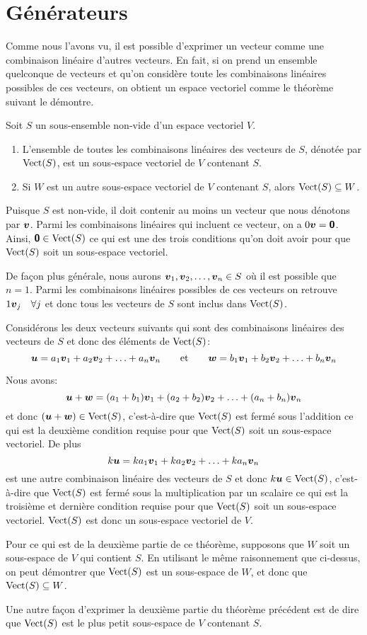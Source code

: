 \section{Générateurs}
Comme nous l'avons vu, il est possible d'exprimer un vecteur comme une combinaison linéaire d'autres vecteurs.
En fait, si on prend un ensemble quelconque de vecteurs et qu'on considère toute les combinaisons linéaires possibles
de ces vecteurs, on obtient un espace vectoriel comme le théorème suivant le démontre.
\begin{theo}
Soit $S$ un sous-ensemble non-vide d'un espace vectoriel $V$.  
\begin{enumerate}
\item L'ensemble de toutes les combinaisons linéaires
des vecteurs de $S$, dénotée par $\operatorname{Vect}(S)$, est un sous-espace vectoriel de $V$ contenant $S$.  
\item Si
$W$ est un autre sous-espace vectoriel de $V$ contenant $S$, alors $\operatorname{Vect}(S)\subseteq W$.
\end{enumerate}
\proof
Puisque $S$ est non-vide, il doit contenir au moins un vecteur que nous dénotons par $\boldsymbol{v}$.  
Parmi les combinaisons linéaires qui incluent ce vecteur, on a $0\boldsymbol{v} = \mbox{\textsf{\textbf{{0}}}}$. 
 Ainsi, $\mbox{\textsf{\textbf{{0}}}}\in \operatorname{Vect}(S)$ ce qui est une des
trois conditions qu'on doit avoir pour que $\operatorname{Vect}(S)$ soit un sous-espace vectoriel.

De façon plus générale, nous aurons $\boldsymbol{v}_1,\boldsymbol{v}_2, \ldots, \boldsymbol{v}_n \in S$ où il est possible que $n=1$. Parmi les combinaisons linéaires possibles de ces vecteurs on retrouve $1 \boldsymbol{v}_j \quad \forall j$ et donc 
tous les vecteurs de $S$ sont inclus dans $\operatorname{Vect}(S)$.

Considérons les deux vecteurs suivants qui sont des combinaisons linéaires des vecteurs de $S$ et donc
des éléments de $\operatorname{Vect}(S)$:
\[ 
    \boldsymbol{u} = a_1\boldsymbol{v}_1 + a_2 \boldsymbol{v}_2 + \ldots + a_n \boldsymbol{v}_n \qquad \mbox{et} \qquad 
    \boldsymbol{w} = b_1\boldsymbol{v}_1 + b_2 \boldsymbol{v}_2 + \ldots + b_n \boldsymbol{v}_n
\]

Nous avons:
\[
    \boldsymbol{u} + \boldsymbol{w} = (a_1 + b_1)\boldsymbol{v}_1 + (a_2 + b_2) \boldsymbol{v}_2 + \ldots + (a_n+ b_n) \boldsymbol{v}_n 
\]
et donc $(\boldsymbol{u} + \boldsymbol{w} ) \in \operatorname{Vect}(S)$, c'est-à-dire que $\operatorname{Vect}(S)$ est fermé sous l'addition ce qui
est la deuxième condition requise pour que $\operatorname{Vect}(S)$ soit un sous-espace vectoriel.
De plus
\[
 k \boldsymbol{u} = ka_1\boldsymbol{v}_1 + ka_2 \boldsymbol{v}_2 + \ldots + ka_n \boldsymbol{v}_n
 \]
est une autre combinaison linéaire des vecteurs de $S$ 
et donc $k\boldsymbol{u} \in \operatorname{Vect}(S)$, c'est-à-dire que  $\operatorname{Vect}(S)$ est fermé sous la multiplication par un scalaire ce qui
est la troisième et dernière condition requise pour que $\operatorname{Vect}(S)$ soit un sous-espace vectoriel.  $\operatorname{Vect}(S)$ est donc un sous-espace vectoriel de $V$.

Pour ce qui est de la deuxième partie de ce théorème, supposons que $W$ soit un sous-espace de $V$ qui contient $S$.
En utilisant le même raisonnement que ci-dessus, on peut démontrer que $\operatorname{Vect}(S)$ est un sous-espace de $W$, et
donc que $\operatorname{Vect}(S)\subseteq W$.
\end{theo}
Une autre façon d'exprimer la deuxième partie du théorème précédent est de dire que $\operatorname{Vect}(S)$ est le plus petit
sous-espace de $V$ contenant $S$.  

